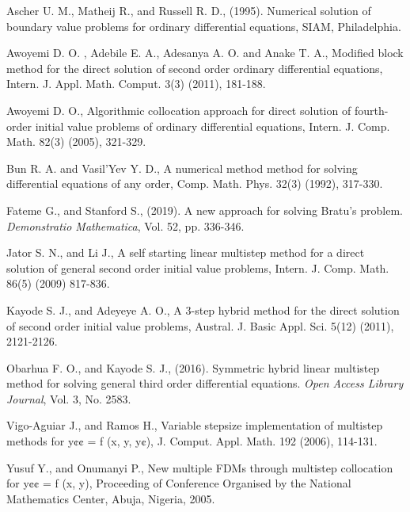 \documentclass[12pt]{report}
\begin{document}
Ascher U. M., Matheij R., and Russell R. D., (1995). Numerical solution of boundary value problems for ordinary differential equations, SIAM, Philadelphia.

Awoyemi D. O. , Adebile E. A., Adesanya A. O. and Anake T. A., Modified block method for the direct solution of second order ordinary differential equations, Intern. J. Appl. Math. Comput. 3(3) (2011), 181-188.

Awoyemi D. O., Algorithmic collocation approach for direct solution of fourth-order initial value problems of ordinary differential equations, Intern. J. Comp. Math. 82(3) (2005), 321-329.

Bun R. A.  and Vasil’Yev Y. D., A numerical method method for solving differential
equations of any order, Comp. Math. Phys. 32(3) (1992), 317-330.

Fateme G., and Stanford S., (2019). A new approach for solving Bratu’s problem. \textit{Demonstratio Mathematica}, Vol. 52, pp. 336-346.

Jator S. N., and Li J., A self starting linear multistep method for a direct solution of general second order initial value problems, Intern. J. Comp. Math. 86(5) (2009) 817-836.

Kayode S. J., and Adeyeye A. O., A 3-step hybrid method for the direct solution of second order initial value problems, Austral. J. Basic Appl. Sci. 5(12) (2011), 2121-2126.

Obarhua F. O., and Kayode S. J., (2016). Symmetric hybrid linear multistep method for solving general third order differential equations. \textit{Open Access Library Journal}, Vol. 3, No. 2583.

Vigo-Aguiar J., and Ramos H., Variable stepsize implementation of multistep methods for y¢¢ = f (x, y, y¢), J. Comput. Appl. Math. 192 (2006), 114-131.

 Yusuf Y., and Onumanyi P., New multiple FDMs through multistep collocation for y¢¢ = f (x, y), Proceeding of Conference Organised by the National Mathematics Center, Abuja, Nigeria, 2005.
\end{document}
